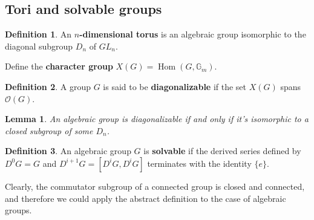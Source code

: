 \documentclass[12pt]{article}
\newtheorem{lemma}{Lemma}[section]
\theoremstyle{remark}
\theoremstyle{definition}
\newtheorem{definition}{Definition}[section]
\newcommand{\G}[0]{\mathbb{G}}
\newcommand{\Hom}[0]{\operatorname{Hom}}
\begin{document}
    \subsection{Tori and solvable groups}
    \begin{definition}
        An \textbf{$n$-dimensional torus} is an algebraic group isomorphic to the diagonal subgroup $D_n$ of $GL_n$.
    \end{definition}
    Define the \textbf{character group} $X(G)=\Hom(G, \G_m)$.
    \begin{definition}
        A group $G$ is said to be \textbf{diagonalizable} if the set $X(G)$ spans $\mathcal O(G)$.
    \end{definition}
    \begin{lemma}
        An algebraic group is diagonalizable if and only if it's isomorphic to a closed subgroup of some $D_n$.
    \end{lemma}
    \begin{definition}
        An algebraic group $G$ is \textbf{solvable} if the derived series defined by $D^0G=G$ and $D^{i+1}G=[D^iG,D^iG]$ terminates with the identity $\{e\}$. 
    \end{definition}
    Clearly, the commutator subgroup of a connected group is closed and connected, and therefore we could apply the abstract definition to the case of algebraic groups.
\end{document}
